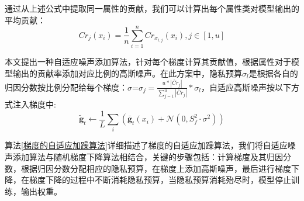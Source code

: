 通过从上述公式中提取同一属性的贡献，我们可以计算出每个属性类对模型输出的平均贡献：
\begin{equation}\label{eq:属性添加自适应扰动}
Cr_{j}\left(x_{i}\right)=\frac{1}{n} \sum_{i=1}^{n} Cr_{x_{i, j}}\left(x_{i}\right), j \in[1, u]
\end{equation}



本文提出一种自适应噪声添加算法，针对每个梯度计算其贡献值，根据属性对于模型输出的贡献率添加对应比例的高斯噪声。在此方案中，隐私预算$\sigma_{l}$是根据各自的归因分数按比例分配给每个梯度：$\sigma$=$\sigma_{j}=\frac{u *\left|\ddot{Cr}_{j}\right|}{\sum_{j=1}^{u}\left|\ddot{Cr}_{j}\right|} * \sigma_{l}$，自适应高斯噪声按以下方式注入梯度中:
\begin{equation}\label{eq:神经网络加噪3}
\tilde{\mathbf{g}}_{t} \leftarrow \frac{1}{L} \sum_{i}\left(\overline{\mathbf{g}}_{t}\left(x_{i}\right)+\mathcal{N}\left(0, S_{f}^{2} \cdot \sigma^{2}\right)\right)
\end{equation}

算法\ref{梯度的自适应加躁算法}详细描述了梯度的自适应加躁算法，我们将自适应噪声添加算法与随机梯度下降算法相结合，关键的步骤包括：计算梯度及其归因分数，根据归因分数分配相应的隐私预算，在梯度上添加高斯噪声，最后进行梯度下降，在梯度下降的过程中不断消耗隐私预算，当隐私预算消耗殆尽时，模型停止训练，输出权重。\\

